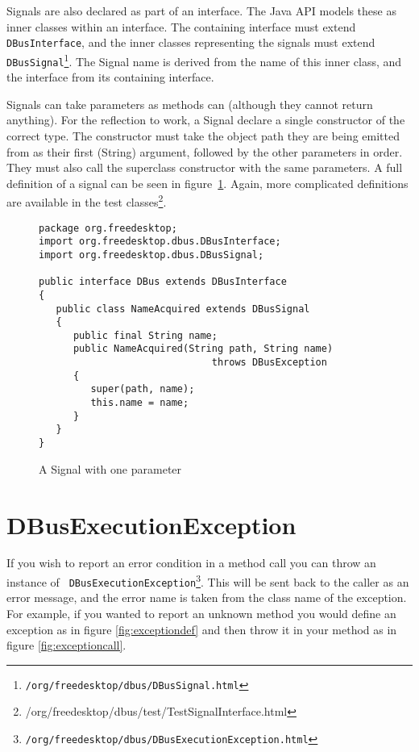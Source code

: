 \documentclass[a4paper,12pt]{article}
\begin{document}
Signals are also declared as part of an interface. The Java API
models these as inner classes within an interface. The containing
interface must extend {\tt DBusInterface}, and the inner classes
representing the signals must extend {\tt
DBusSignal\footnote{\javadocroot/org/freedesktop/dbus/DBusSignal.html}}.
The Signal name is derived from the name of this inner class, and
the interface from its containing interface.

Signals can take parameters as methods can (although they cannot return
      anything). For the reflection to work, a Signal declare a single
constructor of the correct type. The constructor must  take the object path
they are being emitted from as their first (String) argument, followed by the
other parameters in order. They must also call the superclass constructor with
the same parameters.  A full definition of a signal can be seen in
figure~\ref{fig:signal}. Again, more complicated definitions are available in
the test
classes\footnote{\javadocroot/org/freedesktop/dbus/test/TestSignalInterface.html}.

\begin{figure}[htb]
\begin{center}
\begin{verbatim}
package org.freedesktop;
import org.freedesktop.dbus.DBusInterface;
import org.freedesktop.dbus.DBusSignal;

public interface DBus extends DBusInterface
{
   public class NameAcquired extends DBusSignal
   {
      public final String name;
      public NameAcquired(String path, String name) 
                              throws DBusException
      {
         super(path, name);
         this.name = name;
      }
   }
}
\end{verbatim}
\end{center}
\caption{A Signal with one parameter}
\label{fig:signal}
\end{figure}

\section{DBusExecutionException}

If you wish to report an error condition in a method call you can throw an
instance of {\tt
DBusExecutionException\footnote{\javadocroot/org/freedesktop/dbus/DBusExecutionException.html}}.
This will be sent back to the caller as an error message, and the error name is
taken from the class name of the exception. For example, if you wanted to
report an unknown method you would define an exception as in figure
\ref{fig:exceptiondef} and then throw it in your method as in figure
\ref{fig:exceptioncall}.
\end{document}
